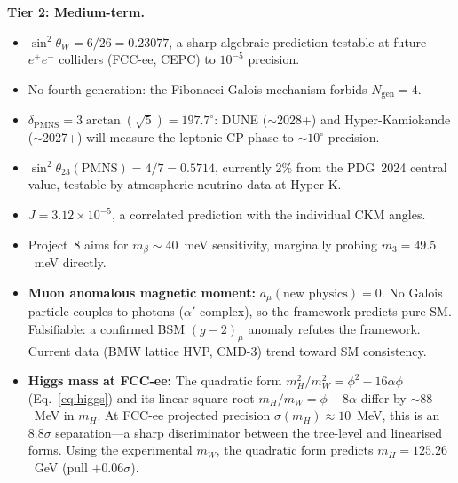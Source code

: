 \documentclass[12pt,a4paper]{article}
\theoremstyle{definition}
\begin{document}
\textbf{Tier 2: Medium-term.}
\begin{itemize}
\item $\sin^2\theta_W = 6/26 = 0.23077$, a sharp algebraic prediction testable at future $e^+e^-$ colliders (FCC-ee, CEPC) to $10^{-5}$ precision.
\item No fourth generation: the Fibonacci-Galois mechanism forbids $N_{\text{gen}} = 4$.
\item $\delta_{\text{PMNS}} = 3\arctan(\sqrt{5}) = 197.7^\circ$: DUNE ($\sim$2028+) and Hyper-Kamiokande ($\sim$2027+) will measure the leptonic CP phase to $\sim 10^\circ$ precision.
\item $\sin^2\theta_{23}(\text{PMNS}) = 4/7 = 0.5714$, currently 2\% from the PDG~2024 central value, testable by atmospheric neutrino data at Hyper-K.
\item $J = 3.12 \times 10^{-5}$, a correlated prediction with the individual CKM angles.
\item Project~8 aims for $m_\beta \sim 40$~meV sensitivity, marginally probing $m_3 = 49.5$~meV directly.
\item \textbf{Muon anomalous magnetic moment:} $a_\mu(\text{new physics}) = 0$.  No Galois particle couples to photons ($\alpha'$ complex), so the framework predicts pure SM.  Falsifiable: a confirmed BSM $(g\!-\!2)_\mu$ anomaly refutes the framework.  Current data (BMW lattice HVP, CMD-3) trend toward SM consistency.
\item \textbf{Higgs mass at FCC-ee:} The quadratic form $m_H^2/m_W^2 = \phi^2 - 16\alpha\phi$ (Eq.~\ref{eq:higgs}) and its linear square-root $m_H/m_W = \phi - 8\alpha$ differ by $\sim\!88$~MeV in $m_H$.  At FCC-ee projected precision $\sigma(m_H) \approx 10$~MeV, this is an $8.8\sigma$ separation---a sharp discriminator between the tree-level and linearised forms.  Using the experimental $m_W$, the quadratic form predicts $m_H = 125.26$~GeV (pull $+0.06\sigma$).
\end{itemize}
\end{document}
